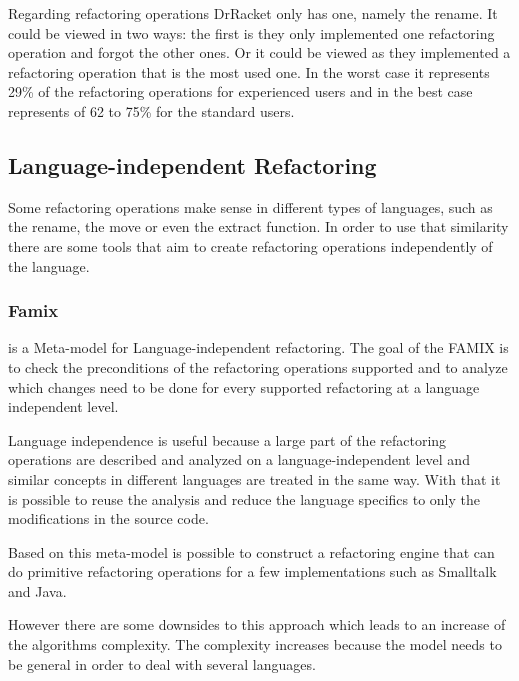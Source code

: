 Regarding refactoring operations DrRacket only has one, namely the rename. 
It could be viewed in two ways: the first is they only implemented one refactoring operation and forgot the other ones.
Or it could be viewed as they implemented a refactoring operation that is the most used one. 
In the worst case it represents 29\% of the refactoring operations for experienced users and in the best case represents of 62 to 75\% for the standard users. 






\subsection{Language-independent Refactoring} %
Some refactoring operations make sense in different types of languages, such as the rename, the move or even the extract function. In order to use that similarity there are some tools that aim to create refactoring operations independently of the language. 

\subsubsection{Famix}
\cite{tichelaar2000meta} is a  Meta-model for Language-independent refactoring.
The goal of the FAMIX is to check the preconditions of the refactoring operations supported and to analyze which changes need to be done for every supported refactoring at a language independent level.

Language independence is useful because a large part of the refactoring operations are described and analyzed on a language-independent level and similar concepts in different languages are treated in the same way. 
With that it is possible to reuse the analysis and reduce the language specifics to only the modifications in the source code.

Based on this meta-model is possible to construct a refactoring engine that can do primitive refactoring operations for a few implementations such as Smalltalk and Java.

However there are some downsides to this approach which leads to an increase of the algorithms complexity. 
The complexity increases because the model needs to be general in order to deal with several languages. 

